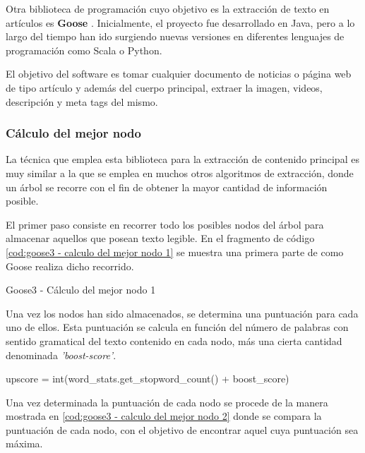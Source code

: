 Otra biblioteca de programación cuyo objetivo es la extracción de texto en artículos es \textbf{Goose} 
\cite{goose3}. Inicialmente, el proyecto fue desarrollado en Java, pero a lo largo del tiempo han ido 
surgiendo nuevas versiones en diferentes lenguajes de programación como Scala o Python.

El objetivo del software es tomar cualquier documento de noticias o página web de tipo artículo y además
del cuerpo principal, extraer la imagen, videos, descripción y meta tags del mismo.

\subsubsection{Cálculo del mejor nodo}
\label{subsubsec:calculo del mejor nodo}

La técnica que emplea esta biblioteca para la extracción de contenido principal es muy similar a la que 
se emplea en muchos otros algoritmos de extracción, donde un árbol se recorre con el fin de obtener la 
mayor cantidad de información posible.

El primer paso consiste en recorrer todo los posibles nodos del árbol para almacenar aquellos que posean 
texto legible. En el fragmento de código \ref{cod:goose3 - calculo del mejor nodo 1} se muestra una primera 
parte de como Goose realiza dicho recorrido.

\begin{codefloat}
  
  \caption{Goose3 - Cálculo del mejor nodo 1}
  \label{cod:goose3 - calculo del mejor nodo 1}
\end{codefloat}

Una vez los nodos han sido almacenados, se determina una puntuación para cada uno de ellos. Esta puntuación 
se calcula en función del número de palabras con sentido gramatical del texto contenido en cada nodo, más
una cierta cantidad denominada \emph{'boost-score'}. 

\begin{Schunk}
  \begin{Soutput}
    upscore = int(word_stats.get_stopword_count() + boost_score)
  \end{Soutput}
\end{Schunk}

Una vez determinada la puntuación de cada nodo se procede de la manera mostrada en 
\ref{cod:goose3 - calculo del mejor nodo 2} donde se compara la puntuación de cada nodo, con el objetivo 
de encontrar aquel cuya puntuación sea máxima.

